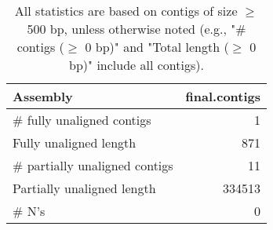 \documentclass[12pt,a4paper]{article}
\begin{document}
\begin{table}[ht]
\begin{center}
\caption{All statistics are based on contigs of size $\geq$ 500 bp, unless otherwise noted (e.g., "\# contigs ($\geq$ 0 bp)" and "Total length ($\geq$ 0 bp)" include all contigs).}
\begin{tabular}{|l*{1}{|r}|}
\hline
Assembly & final.contigs \\ \hline
\# fully unaligned contigs & 1 \\ \hline
Fully unaligned length & 871 \\ \hline
\# partially unaligned contigs & 11 \\ \hline
Partially unaligned length & 334513 \\ \hline
\# N's & 0 \\ \hline
\end{tabular}
\end{center}
\end{table}
\end{document}
